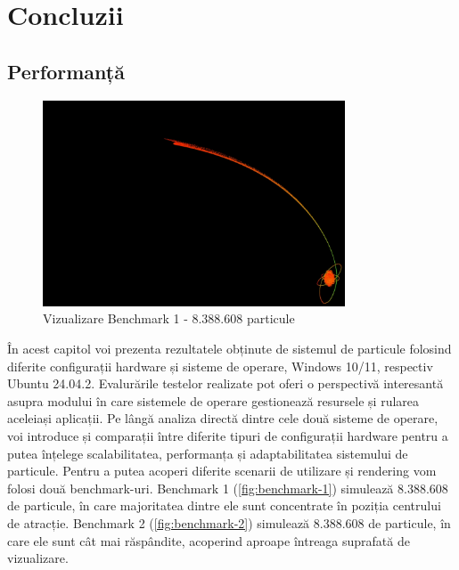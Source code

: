 \chapter{Concluzii}

\section{Performanță}
\begin{figure}[ht]
    \centering
    \includegraphics[width=0.8\textwidth]{images/benchmark-1.png}
    \caption{Vizualizare Benchmark 1 - 8.388.608 particule}
    \label{fig:benchmark-1}
\end{figure}

În acest capitol voi prezenta rezultatele obținute de sistemul de particule folosind diferite configurații hardware și sisteme de operare, Windows 10/11, respectiv Ubuntu 24.04.2. Evalurările testelor realizate pot oferi o perspectivă interesantă asupra modului în care sistemele de operare gestionează resursele și rularea aceleiași aplicații. Pe lângă analiza directă dintre cele două sisteme de operare, voi introduce și comparații între diferite tipuri de configurații hardware pentru a putea înțelege scalabilitatea, performanța și adaptabilitatea sistemului de particule. Pentru a putea acoperi diferite scenarii de utilizare și rendering vom folosi două benchmark-uri. Benchmark 1 (\autoref{fig:benchmark-1}) simulează 8.388.608 de particule, în care majoritatea dintre ele sunt concentrate în poziția centrului de atracție. Benchmark 2 (\autoref{fig:benchmark-2}) simulează 8.388.608 de particule, în care ele sunt cât mai răspândite, acoperind aproape întreaga suprafată de vizualizare. 

